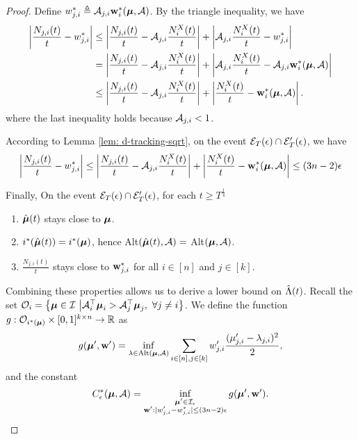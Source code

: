 \begin{proof}
    Define $w^{*}_{j,i} \triangleq \mathcal{A}_{j,i}\mathbf{w}^{*}_{i}(\boldsymbol{\mu}, \mathcal{A})$. By the triangle inequality, we have
        \begin{align*}
            \left \vert \frac{N_{j,i}(t)}{t} - w^{*}_{j,i} \right \vert & \leq \left \vert \frac{N_{j,i}(t)}{t} - \mathcal{A}_{j, i} \frac{N^{X}_{i}(t)}{t} \right \vert + \left \vert \mathcal{A}_{j, i} \frac{N^{X}_{i}(t)}{t}  - w^{*}_{j,i}   \right \vert  \\
            &= \left \vert \frac{N_{j,i}(t)}{t} - \mathcal{A}_{j, i} \frac{N^{X}_{i}(t)}{t} \right \vert + \left \vert \mathcal{A}_{j, i} \frac{N^{X}_{i}(t)}{t} - \mathcal{A}_{j,i}\mathbf{w}^{*}_{i}(\boldsymbol{\mu},\mathcal{A}) \right \vert \\
            &\leq \left \vert \frac{N_{j,i}(t)}{t} - \mathcal{A}_{j, i} \frac{N^{X}_{i}(t)}{t}  \right \vert + \left \vert \frac{N^{X}_{i}(t)}{t}  - \mathbf{w}^{*}_{i}(\boldsymbol{\mu}, \mathcal{A}) \right \vert.
        \end{align*}
    where the last inequality holds because $\mathcal{A}_{j,i} < 1$.   

    According to Lemma \ref{lem: d-tracking-sqrt}, on the event $\mathcal{E}_T(\epsilon) \cap \mathcal{E}'_T(\epsilon)$, we have
    $$
        \left \vert \frac{N_{j,i}(t)}{t} - w^{*}_{j,i} \right \vert \leq \left \vert \frac{N_{j,i}(t)}{t} - \mathcal{A}_{j, i} \frac{N^{X}_{i}(t)}{t}  \right \vert + \left \vert \frac{N^{X}_{i}(t)}{t}  - \mathbf{w}^{*}_{i}(\boldsymbol{\mu}, \mathcal{A}) \right \vert \leq (3n - 2)\epsilon
    $$        
    
    Finally, On the event $\mathcal{E}_T(\epsilon) \cap \mathcal{E}'_T(\epsilon)$, for each $t \geq T^{\frac{1}{4}}$
    \begin{enumerate}
        \item $\hat{\boldsymbol{\mu}}(t)$ stays close to $\boldsymbol{\mu}$.
        \item $i^*(\hat{\boldsymbol{\mu}}(t)) = i^*(\boldsymbol{\mu})$, hence Alt$(\hat{\boldsymbol{\mu}}(t), \mathcal{A}) = $ Alt$(\boldsymbol{\mu}, \mathcal{A})$.
        \item $\frac{N_{j,i}(t)}{t}$ stays close to $\mathbf{w}^{*}_{j,i}$ for all $i \in [n]$ and $j \in [k]$.
     \end{enumerate}
    
    Combining these properties allows us to derive a lower bound on $\hat{\Lambda}(t)$. Recall the set $\mathcal{O}_i = \left\{ \boldsymbol{\mu} \in \mathcal{I} \ \big| \mathcal{A}_i^\top \boldsymbol{\mu}_i > \mathcal{A}_j^\top \boldsymbol{\mu}_j, \ \forall j \neq i \right\}$. We define the function $g: \mathcal{O}_{i^*(\boldsymbol{\mu})} \times [0,1] ^{k \times n} \rightarrow \mathbb{R}$ as
    \begin{align*}
        g(\boldsymbol{\mu}', \mathbf{w}') = \inf_{\mathbf{\lambda} \in \text{Alt}(\boldsymbol{\mu}, \mathcal{A})} \sum_{i \in [n], j \in [k]} w'_{j,i} \frac{(\mu'_{j,i} - \mathbf{\lambda}_{j,i})^2}{2},
    \end{align*}
    and the constant 
    \begin{align*}
        C^*_{\epsilon}(\boldsymbol{\mu}, \mathcal{A}) = \inf_{\substack{\boldsymbol{\mu}' \in \mathcal{I}_{\epsilon} \\ \mathbf{w}': \vert w'_{j, i} - w^{*}_{j, i}  \vert \leq (3n-2) \epsilon}} g(\boldsymbol{\mu}', \mathbf{w}').
    \end{align*}



\end{proof}
